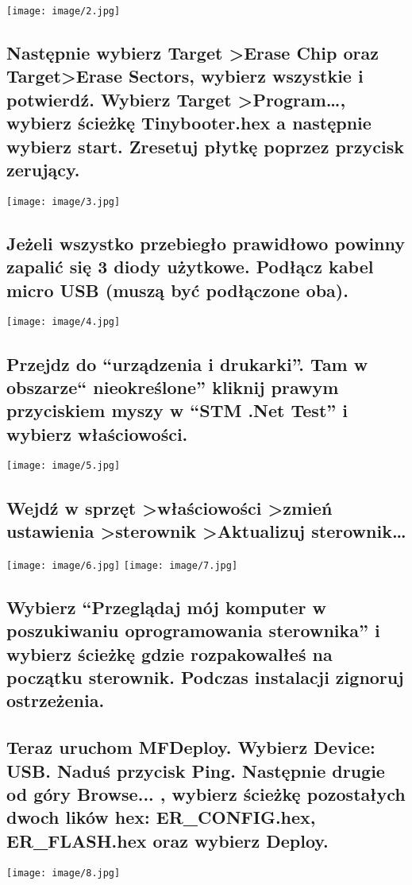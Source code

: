 \documentclass{article}
\begin{document}
\texttt{[image: image/2.jpg]}
\subsection{Następnie wybierz Target \textgreater Erase Chip oraz Target\textgreater Erase Sectors, wybierz wszystkie i potwierdź. Wybierz Target \textgreater Program…, wybierz ścieżkę Tinybooter.hex a następnie wybierz start. Zresetuj płytkę poprzez przycisk zerujący.}

\texttt{[image: image/3.jpg]}
\subsection{Jeżeli wszystko przebiegło prawidłowo powinny zapalić się 3 diody użytkowe. Podłącz kabel micro USB (muszą być podłączone oba).}

\texttt{[image: image/4.jpg]}
\subsection{Przejdz do “urządzenia i drukarki”. Tam w obszarze“ nieokreślone” kliknij prawym przyciskiem myszy w “STM .Net Test” i wybierz właściowości.}

\texttt{[image: image/5.jpg]}
\subsection{Wejdź w sprzęt \textgreater właściowości \textgreater zmień ustawienia \textgreater sterownik \textgreater Aktualizuj sterownik…}

\texttt{[image: image/6.jpg]}
\texttt{[image: image/7.jpg]} 
\subsection{Wybierz “Przeglądaj mój komputer w poszukiwaniu oprogramowania sterownika” i wybierz ścieżkę gdzie rozpakowalłeś na początku sterownik. Podczas instalacji zignoruj ostrzeżenia.}

\subsection{Teraz uruchom MFDeploy. Wybierz Device: USB. Naduś przycisk Ping. Następnie drugie od góry Browse... , wybierz ścieżkę pozostałych dwoch lików hex: ER\_CONFIG.hex, ER\_FLASH.hex oraz wybierz Deploy.}
\texttt{[image: image/8.jpg]}
\end{document}
